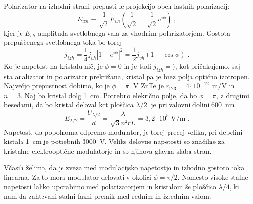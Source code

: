 \documentclass[11pt,fleqn]{book} %
\begin{document}
Polarizator na izhodni strani prepusti le projekcijo obeh lastnih
polarizacij: 
\begin{equation}
E_{izh}=\frac{1}{\sqrt{2}}E_{vh}(\frac{1}{\sqrt{2}}-\frac{1}{\sqrt{2}}e^{i\phi})\;,\label{7.16}
\end{equation}
 kjer je $E_{vh}$ amplituda svetlobnega vala za vhodnim polarizatorjem.
Gostota prepuščenega svetlobnega toka bo torej 
\begin{equation}
j_{izh}=\frac{1}{4}j_{vh}|1-e^{i\phi}|^{2}=\frac{1}{2}j_{vh}(1-\cos\phi)\;.\label{7.17}
\end{equation}
 Ko je napetost na kristalu nič, je $\phi=0$ in je tudi $j_{izh}=)$,
kot pričakujemo, saj sta analizator in polarizator prekrižana, kristal
pa je brez polja optično izotropen. Največjo prepustnost dobimo, ko
je $\phi=\pi$. V ZnTe je $r_{123}=4\cdot10^{-12}$~m/V in $n=3$.
Naj bo kristal dolg 1~cm. Potrebno elekrično polje, da bo $\phi=\pi$,
z drugimi besedami, da bo kristal deloval kot ploščica $\lambda/2$,
je pri valovni dol\textquotedbl{}ini 600~nm 
\begin{equation}
E_{\lambda/2}=\frac{U_{\lambda/2}}{d}=\frac{\lambda}{\sqrt{3}n^{3}rL}=3,2\cdot10^{5}\mbox{ V/m}\;.\label{7.18}
\end{equation}
 Napetost, da popolnoma odpremo modulator, je torej precej velika,
pri debelini kistala 1~cm je potrebnih 3000~V. Velike delovne napetosti
so značilne za kristalne elektrooptične modulatorje in so njihova
glavna slaba stran.

Včasih želimo, da je zveza med modulacijsko napetostjo in izhodno
gostoto toka linearna. Za to mora modulator delovati v okolici $\phi=\pi/2$.
Namesto visoke stalne napetosti lahko uporabimo med polarizatorjem
in kristalom še ploščico $\lambda/4$, ki nam da zahtevani stalni
fazni premik med rednim in izrednim valom.
\end{document}
